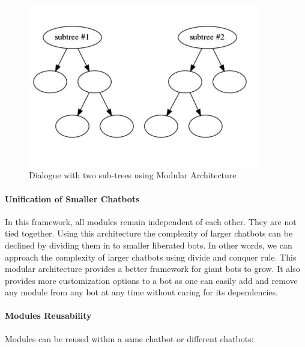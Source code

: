 \begin{figure}[!h]
    \centering
    \includegraphics[width=0.9\textwidth]{img/Modular_Architecture_2.PNG}
    \caption{Dialogue with two sub-trees using Modular Architecture}
    \label{fig:modArch2}
\end{figure}

\paragraph*{Unification of Smaller Chatbots}
In this framework, all modules remain independent of each other. They are not tied together. Using this architecture the complexity of larger chatbots can be declined by dividing them in to smaller liberated bots. In other words, we can approach the complexity of larger chatbots using divide and conquer rule. This modular architecture provides a better framework for giant bots to grow. It also provides more customization options to a bot as one can easily add and remove any module from any bot at any time without caring for its dependencies.

\paragraph*{Modules Reusability}
Modules can be reused within a same chatbot or different chatbots:

